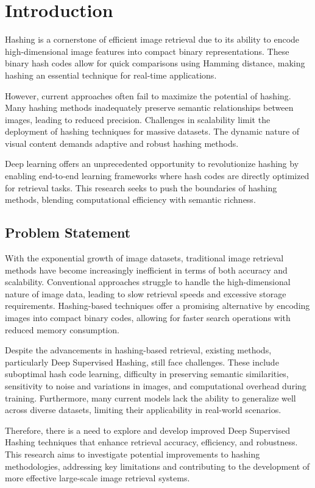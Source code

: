 \section{Introduction}


Hashing is a cornerstone of efficient image retrieval due to its ability to encode high-dimensional image features 
into compact binary representations. These binary hash codes allow for quick comparisons using Hamming distance, 
making hashing an essential technique for real-time applications. 

However, current approaches often fail to maximize the potential of hashing. 
Many hashing methods inadequately preserve semantic relationships between images, leading to reduced precision.
Challenges in scalability limit the deployment of hashing techniques for massive datasets.
The dynamic nature of visual content demands adaptive and robust hashing methods.

Deep learning offers an unprecedented opportunity to revolutionize hashing by enabling end-to-end learning frameworks 
where hash codes are directly optimized for retrieval tasks. This research seeks to push the boundaries of hashing 
methods, blending computational efficiency with semantic richness.


\subsection{Problem Statement}

With the exponential growth of image datasets, traditional image retrieval methods have become increasingly inefficient in terms of both accuracy and scalability. Conventional approaches struggle to handle the high-dimensional nature of image data, leading to slow retrieval speeds and excessive storage requirements. Hashing-based techniques offer a promising alternative by encoding images into compact binary codes, allowing for faster search operations with reduced memory consumption.

Despite the advancements in hashing-based retrieval, existing methods, particularly Deep Supervised Hashing, still face challenges. These include suboptimal hash code learning, difficulty in preserving semantic similarities, sensitivity to noise and variations in images, and computational overhead during training. Furthermore, many current models lack the ability to generalize well across diverse datasets, limiting their applicability in real-world scenarios.

Therefore, there is a need to explore and develop improved Deep Supervised Hashing techniques that enhance retrieval accuracy, efficiency, and robustness. This research aims to investigate potential improvements to hashing methodologies, addressing key limitations and contributing to the development of more effective large-scale image retrieval systems.







